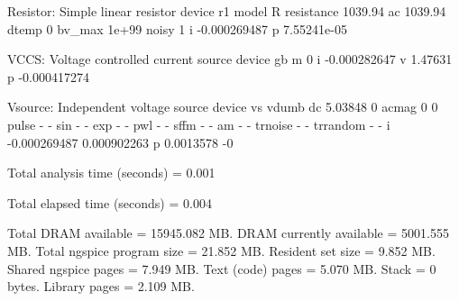  Resistor: Simple linear resistor
     device                    r1
      model                     R
 resistance               1039.94
         ac               1039.94
      dtemp                     0
     bv_max                 1e+99
      noisy                     1
          i          -0.000269487
          p           7.55241e-05

 VCCS: Voltage controlled current source
     device                    gb
          m                     0
          i          -0.000282647
          v               1.47631
          p          -0.000417274

 Vsource: Independent voltage source
     device                    vs                 vdumb
         dc               5.03848                     0
      acmag                     0                     0
      pulse         -         -
        sin         -         -
        exp         -         -
        pwl         -         -
       sffm         -         -
         am         -         -
    trnoise         -         -
   trrandom         -         -
          i          -0.000269487           0.000902263
          p             0.0013578                    -0


Total analysis time (seconds) = 0.001

Total elapsed time (seconds) = 0.004 

Total DRAM available = 15945.082 MB.
DRAM currently available = 5001.555 MB.
Total ngspice program size =   21.852 MB.
Resident set size =    9.852 MB.
Shared ngspice pages =    7.949 MB.
Text (code) pages =    5.070 MB.
Stack = 0 bytes.
Library pages =    2.109 MB.

